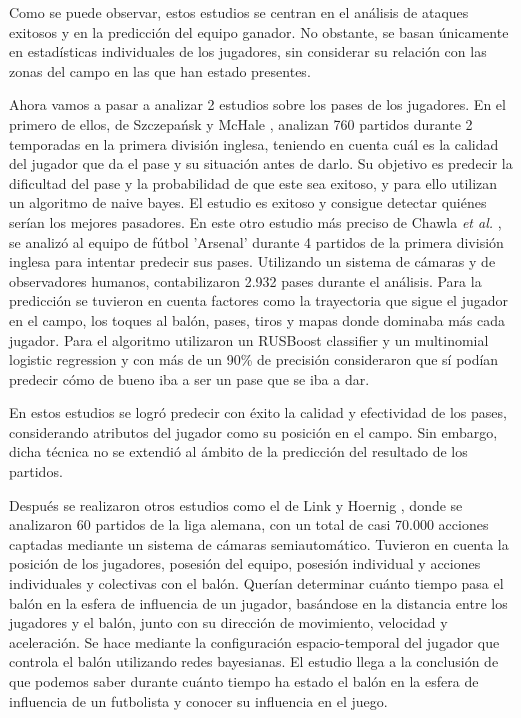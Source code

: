 Como se puede observar, estos estudios se centran en el análisis de ataques exitosos y en la predicción del equipo ganador. No obstante, se basan únicamente en estadísticas individuales de los jugadores, sin considerar su relación con las zonas del campo en las que han estado presentes.

Ahora vamos a pasar a analizar 2 estudios sobre los pases de los jugadores. En el primero de ellos, de Szczepańsk y McHale \cite{first-passes}, analizan 760 partidos durante 2 temporadas en la primera división inglesa, teniendo en cuenta cuál es la calidad del jugador que da el pase y su situación antes de darlo. Su objetivo es predecir la dificultad del pase y la probabilidad de que este sea exitoso, y para ello utilizan un algoritmo de naive bayes. El estudio es exitoso y consigue detectar quiénes serían los mejores pasadores. En este otro estudio más preciso de Chawla \textit{et al.} \cite{second-passes}, se analizó al equipo de fútbol 'Arsenal' durante 4 partidos de la primera división inglesa para intentar predecir sus pases. Utilizando un sistema de cámaras y de observadores humanos, contabilizaron 2.932 pases durante el análisis. Para la predicción se tuvieron en cuenta factores como la trayectoria que sigue el jugador en el campo, los toques al balón, pases, tiros y mapas donde dominaba más cada jugador. Para el algoritmo utilizaron un RUSBoost classifier y un multinomial logistic regression y con más de un 90\% de precisión consideraron que sí podían predecir cómo de bueno iba a ser un pase que se iba a dar.

En estos estudios se logró predecir con éxito la calidad y efectividad de los pases, considerando atributos del jugador como su posición en el campo. Sin embargo, dicha técnica no se extendió al ámbito de la predicción del resultado de los partidos.

Después se realizaron otros estudios como el de Link y Hoernig \cite{first-other}, donde se analizaron 60 partidos de la liga alemana, con un total de casi 70.000 acciones captadas mediante un sistema de cámaras semiautomático. Tuvieron en cuenta la posición de los jugadores, posesión del equipo, posesión individual y acciones individuales y colectivas con el balón. Querían determinar cuánto tiempo pasa el balón en la esfera de influencia de un jugador, basándose en la distancia entre los jugadores y el balón, junto con su dirección de movimiento, velocidad y aceleración. Se hace mediante la configuración espacio-temporal del jugador que controla el balón utilizando redes bayesianas. El estudio llega a la conclusión de que podemos saber durante cuánto tiempo ha estado el balón en la esfera de influencia de un futbolista y conocer su influencia en el juego.

